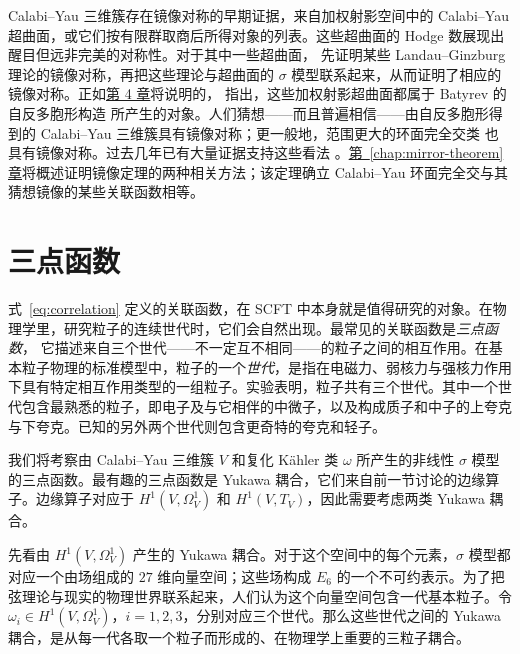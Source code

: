 Calabi--Yau 三维簇存在镜像对称的早期证据，来自加权射影空间中的 Calabi--Yau 超曲面，或它们按有限群取商后所得对象的列表。这些超曲面的 Hodge 数展现出醒目但远非完美的对称性。对于其中一些超曲面， 先证明某些 Landau--Ginzburg 理论的镜像对称，再把这些理论与超曲面的 $\sigma$ 模型联系起来，从而证明了相应的镜像对称。正如\hyperref[chap:mirror-constructions]{第 4 章}将说明的， 指出，这些加权射影超曲面都属于 Batyrev 的自反多胞形构造  所产生的对象。人们猜想——而且普遍相信——由自反多胞形得到的 Calabi--Yau 三维簇具有镜像对称；更一般地，范围更大的环面完全交类  也具有镜像对称。过去几年已有大量证据支持这些看法 。\hyperref[chap:mirror-theorem]{第~\ref*{chap:mirror-theorem} 章}将概述证明镜像定理的两种相关方法；该定理确立 Calabi--Yau 环面完全交与其猜想镜像的某些关联函数相等。

\section{三点函数}\label{sec:three-point}
式~\eqref{eq:correlation} 定义的关联函数，在 SCFT 中本身就是值得研究的对象。在物理学里，研究粒子的连续世代时，它们会自然出现。最常见的关联函数是\emph{三点函数}，
它描述来自三个世代——不一定互不相同——的粒子之间的相互作用。在基本粒子物理的标准模型中，粒子的一个\emph{世代}，是指在电磁力、弱核力与强核力作用下具有特定相互作用类型的一组粒子。实验表明，粒子共有三个世代。其中一个世代包含最熟悉的粒子，即电子及与它相伴的中微子，以及构成质子和中子的上夸克与下夸克。已知的另外两个世代则包含更奇特的夸克和轻子。

我们将考察由 Calabi--Yau 三维簇 $V$ 和复化 Kähler 类 $\omega$ 所产生的非线性 $\sigma$ 模型的三点函数。最有趣的三点函数是 Yukawa 耦合，它们来自前一节讨论的边缘算子。边缘算子对应于 $H^1(V,\Omega_V^1)$ 和 $H^1(V,T_V)$，因此需要考虑两类 Yukawa 耦合。

先看由 $H^1(V,\Omega_V^1)$ 产生的 Yukawa 耦合。对于这个空间中的每个元素，$\sigma$ 模型都对应一个由场组成的 $27$ 维向量空间；这些场构成 $E_6$ 的一个不可约表示。为了把弦理论与现实的物理世界联系起来，人们认为这个向量空间包含一代基本粒子。令 $\omega_i\in H^1(V,\Omega_V^1)$，$i=1,2,3$，分别对应三个世代。那么这些世代之间的 Yukawa 耦合，是从每一代各取一个粒子而形成的、在物理学上重要的三粒子耦合。

